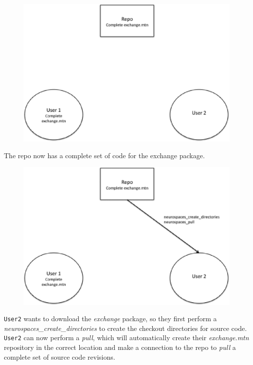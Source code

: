 \documentclass[12pt]{article}
\begin{document}
\begin{figure}[h]
\centering
   \includegraphics[scale=0.5]{figures/repo3.eps}
   \label{fig:R3}
\end{figure}

The repo now has a complete set of code for the exchange package.

\begin{figure}[h]
\centering
   \includegraphics[scale=0.5]{figures/repo4.eps}
   \label{fig:R4}
\end{figure}

{\tt User2} wants to download the {\it exchange} package, so they first perform a {\it neurospaces\_create\_directories} to create the checkout directories for source code. {\tt User2} can now perform a {\it pull}, which will automatically create their {\it exchange.mtn} repository in the correct location and make a connection to the repo to {\it pull} a complete set of source code revisions.
\end{document}
